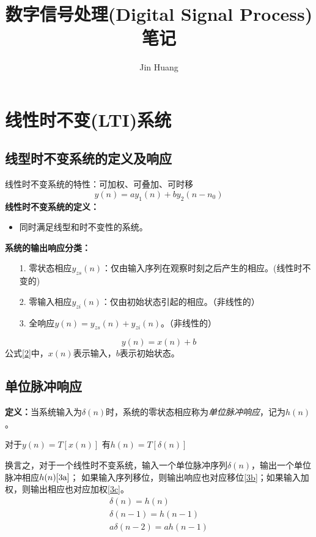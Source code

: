 \documentclass[cn,hazy,blue,14pt,screen,normal]{elegantnote}
\title{数字信号处理(Digital Signal Process)笔记}
\author{Jin Huang}
\begin{document}
\maketitle
\newpage
\section{线性时不变(LTI)系统}
\subsection{线型时不变系统的定义及响应}
线性时不变系统的特性：可加权、可叠加、可时移
\begin{equation}
    y(n) = ay_1(n)+by_2(n-n_0) \label{1}
\end{equation}
\textbf{线性时不变系统的定义：}
\begin{itemize}
    \item 同时满足线型和时不变性的系统。
\end{itemize}
\textbf{系统的输出响应分类：}
\begin{itemize}
    \item[1. ]  零状态相应$y_{zs}(n)$：仅由输入序列在观察时刻之后产生的相应。(线性时不变的)
    \item[2. ]  零输入相应$y_{zi}(n)$：仅由初始状态引起的相应。（非线性的）
    \item[3. ]  全响应$y(n) = y_{zs}(n)+y_{zi}(n)$。（非线性的）
\end{itemize}
\begin{equation}
    y(n) = x(n) + b \label{2}
\end{equation}
公式\ref{2}中，$x(n)$表示输入，$b$表示初始状态。

\subsection{单位脉冲响应}
\textbf{定义：}当系统输入为$\delta(n)$时，系统的零状态相应称为\emph{单位脉冲响应}，记为$h(n)$。

\qquad 对于$y(n) = T[x(n)]$ \qquad 有$h(n) = T[\delta(n)]$

换言之，对于一个线性时不变系统，输入一个单位脉冲序列$\delta(n)$，输出一个单位脉冲相应$h(n)\ref{3a}$；
如果输入序列移位，则输出响应也对应移位\ref{3b}；如果输入加权，则输出相应也对应加权\ref{3c}。
\begin{subequations}
\begin{align}
    \delta(n) = h(n) \label{3a} \\
    \delta(n-1) = h(n-1) \label{3b} \\
    a \delta(n-2) = ah(n-1) \label{3c}
\end{align}
\end{subequations}
\end{document}
